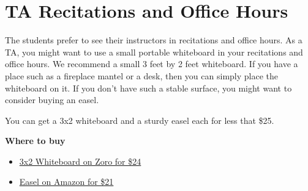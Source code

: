 \chapter{TA Recitations and Office Hours}

\begin{gram}

The students prefer to see their instructors in recitations and office
hours. As a TA, you might want to use a small portable whiteboard in
your recitations and office hours.  We recommend a small 3 feet by 2
feet whiteboard.  If you have a place such as a fireplace mantel or a
desk, then you can simply place the whiteboard on it.  If you don't
have such a stable surface, you might want to consider buying an
easel.

You can get a 3x2 whiteboard and a sturdy easel each for less that \$25.  

\textbf{Where to buy}
\begin{itemize}
\item

\href{https://www.zoro.com/zoro-select-dry-erase-board-36-w-silver-1nup9/i/G1291367/}{3x2
  Whiteboard on Zoro for \$24}

\item 
\href{https://www.amazon.com/Reinforced-Aluminum-Adjustable-Table-Top-Displaying/dp/B076X3WZHB/ref=sr_1_1_sspa?dchild=1&keywords=easel&qid=1597681145&s=office-products&sr=1-1-spons&psc=1&spLa=ZW5jcnlwdGVkUXVhbGlmaWVyPUExS1NMVkxEU1JZMVBHJmVuY3J5cHRlZElkPUEwMzQ3ODQwM1FYWDJCUFE0UzVMUSZlbmNyeXB0ZWRBZElkPUEwMzU2NjAyM0hVSEtONUpEOE4yMiZ3aWRnZXROYW1lPXNwX2F0ZiZhY3Rpb249Y2xpY2tSZWRpcmVjdCZkb05vdExvZ0NsaWNrPXRydWU=}
{Easel on Amazon for \$21}

\end{itemize}

\end{gram}

\begin{gram}[Mobile Phone Stand}
TODO
\end{gram}


\begin{gram}[How}
TODO: How to video
\end{gram}
